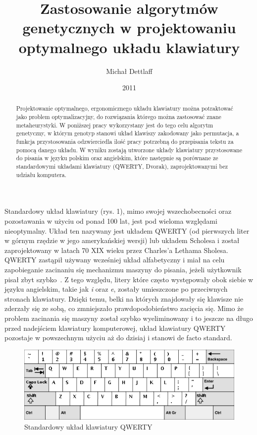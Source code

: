\documentclass[brudnopis]{xmgr}
\author   {Michał Dettlaff}
\title    {Zastosowanie algorytmów genetycznych w projektowaniu optymalnego układu klawiatury}
\date     {2011}
\begin{document}
\begin{abstract}
  Projektowanie optymalnego, ergonomicznego układu klawiatury można potraktować jako problem optymalizacyjny, do rozwiązania którego można zastosować znane metaheurystyki. W poniższej pracy wykorzystany jest do tego celu algorytm genetyczny, w którym genotyp stanowi układ klawiszy zakodowany jako permutacja, a funkcja przystosowania odzwierciedla ilość pracy potrzebną do przepisania tekstu za pomocą danego układu. W wyniku zostają utworzone układy klawiatury przystosowane do pisania w języku polskim oraz angielskim, które następnie są porównane ze standardowymi układami klawiatury (QWERTY, Dvorak), zaprojektowanymi bez udziału komputera.
\end{abstract}

\maketitle
%
\introduction

Standardowy układ klawiatury (rys. 1), mimo swojej wszechobecności oraz pozostawania w użyciu od ponad 100 lat, jest pod wieloma względami nieoptymalny. Układ ten nazywany jest układem QWERTY (od pierwszych liter w górnym rzędzie w jego amerykańskiej wersji) lub układem Scholesa i został zaprojektowany w latach 70 XIX wieku przez Charles'a Lethama Sholesa. QWERTY zastąpił używany wcześniej układ alfabetyczny i miał na celu zapobieganie zacinaniu się mechanizmu maszyny do pisania, jeżeli użytkownik pisał zbyt szybko~\cite{Norman:1988:DOET}. Z tego względu, litery które często występowały obok siebie w języku angielskim, takie jak \emph{i} oraz \emph{e}, zostały umieszczone po przeciwnych stronach klawiatury. Dzięki temu, belki na których znajdowały się klawisze nie zderzały się ze sobą, co zmniejszało prawdopodobieństwo zacięcia się. Mimo że problem zacinania się maszyny został szybko wyeliminowany i to jeszcze na długo przed nadejściem klawiatury komputerowej, układ klawiatury QWERTY pozostaje w powszechnym użyciu aż do dzisiaj i stanowi de facto standard.

\begin{figure}[!tbh]
\centering
\includegraphics[width=.8\hsize]{fig/qwerty}
\caption{Standardowy układ klawiatury QWERTY}
\end{figure}
\end{document}
